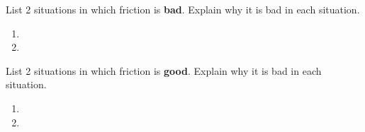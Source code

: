\documentclass[10pt]{examdesign}
\begin{document}
\begin{shortanswer} [title={Free Response},
	rearrange=no]
	
	\begin{question}
		List 2 situations in which friction is \textbf{bad}.  Explain why it is bad in each situation.
		
		\begin{enumerate}
			\item
			
		
			 
			\item 	 \vspace{1 in}
	
		\end{enumerate}
		\end{question}
	
	
		\begin{question}
		 \vspace{1 in}	List 2 situations in which friction is \textbf{good}.  Explain why it is bad in each situation.
		
		\begin{enumerate}
			\item

			\item 
			\vspace{1 in}
		\end{enumerate}
	\end{question}
	

	
	\end{shortanswer}
\end{document}

